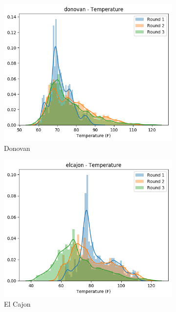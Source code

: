 \documentclass{article}
\begin{document}
\begin{figure}
\centering
\begin{subfigure}{0.32\textwidth}
\includegraphics[width=\textwidth]{results/distributions/location_donovan_temperature.png}
\caption{Donovan}
\end{subfigure}
\begin{subfigure}{0.32\textwidth}
\includegraphics[width=\textwidth]{results/distributions/location_elcajon_temperature.png}
\caption{El Cajon}
\end{subfigure}
\begin{subfigure}{0.32\textwidth}

\end{subfigure}
\end{figure}
\end{document}
